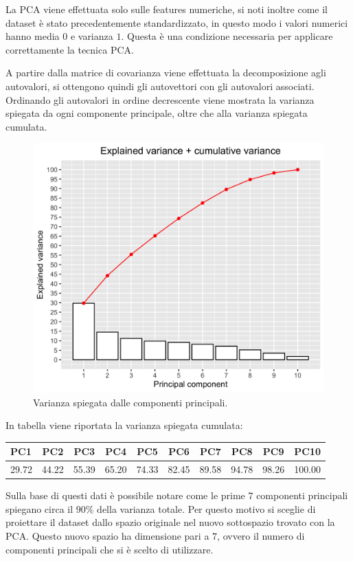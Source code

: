 La PCA viene effettuata solo sulle features numeriche, si noti inoltre
come il dataset è stato precedentemente standardizzato, in questo modo
i valori numerici hanno media $0$ e varianza $1$. Questa è
una condizione necessaria per applicare correttamente la tecnica PCA.

A partire dalla matrice di covarianza viene effettuata la
decomposizione agli autovalori, si ottengono quindi gli autovettori
con gli autovalori associati. Ordinando gli autovalori in ordine
decrescente viene mostrata la varianza spiegata da ogni componente
principale, oltre che alla varianza spiegata cumulata.

\begin{figure}[H]
	\centering
	\includegraphics[width=13cm]{../images/pca_variance_explained.png}
	\caption{Varianza spiegata dalle componenti principali.}
\end{figure}

In tabella viene riportata la varianza spiegata cumulata:


	\begin{tabular}{|l c c c c c c c c c|} 
		\hline
		PC1 & PC2 & PC3 & PC4 & PC5 & PC6 & PC7 & PC8 & PC9 & PC10\\
		\hline
		29.72 &
		44.22 &
		55.39 &
		65.20 &
		74.33 &
		82.45 &
		89.58 &
		94.78 &
		98.26 &
		100.00 \\
		\hline
		
	\end{tabular}

Sulla base di questi dati è possibile notare come le prime $7$
componenti principali spiegano circa il $90\%$ della varianza
totale. Per questo motivo si sceglie di proiettare il dataset dallo
spazio originale nel nuovo sottospazio trovato con la PCA. Questo
nuovo spazio ha dimensione pari a $7$, ovvero il numero di componenti
principali che si è scelto di utilizzare.

